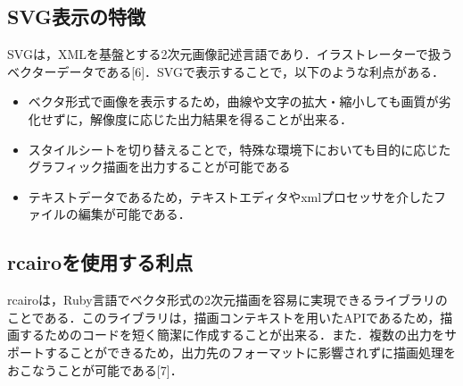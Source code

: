 \subsection{SVG表示の特徴}
SVGは，XMLを基盤とする2次元画像記述言語であり．イラストレーターで扱うベクターデータである[6]．SVGで表示することで，以下のような利点がある．

\begin{itemize}
\item ベクタ形式で画像を表示するため，曲線や文字の拡大・縮小しても画質が劣化せずに，解像度に応じた出力結果を得ることが出来る．
\item スタイルシートを切り替えることで，特殊な環境下においても目的に応じたグラフィック描画を出力することが可能である
\item テキストデータであるため，テキストエディタやxmlプロセッサを介したファイルの編集が可能である．
\end{itemize}
\subsection{rcairoを使用する利点}
rcairoは，Ruby言語でベクタ形式の2次元描画を容易に実現できるライブラリのことである．このライブラリは，描画コンテキストを用いたAPIであるため，描画するためのコードを短く簡潔に作成することが出来る．また．複数の出力をサポートすることができるため，出力先のフォーマットに影響されずに描画処理をおこなうことが可能である[7]．

